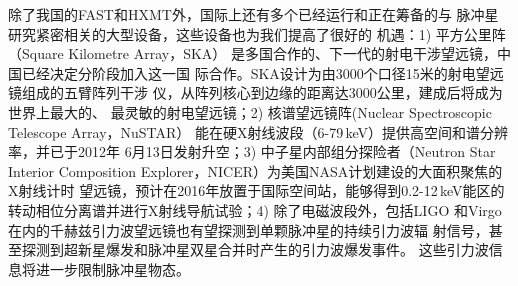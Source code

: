 除了我国的FAST和HXMT外，国际上还有多个已经运行和正在筹备的与
脉冲星研究紧密相关的大型设备，这些设备也为我们提高了很好的
机遇：1) 平方公里阵（Square Kilometre Array，SKA）
是多国合作的、下一代的射电干涉望远镜，中国已经决定分阶段加入这一国
际合作。SKA设计为由3000个口径15米的射电望远镜组成的五臂阵列干涉
仪，从阵列核心到边缘的距离达3000公里，建成后将成为世界上最大的、
最灵敏的射电望远镜；2) 核谱望远镜阵(Nuclear Spectroscopic Telescope Array，NuSTAR）
能在硬X射线波段（6-79\,keV）提供高空间和谱分辨率，并已于2012年
6月13日发射升空；3) 中子星内部组分探险者（Neutron Star Interior Composition 
Explorer，NICER）为美国NASA计划建设的大面积聚焦的X射线计时
望远镜，预计在2016年放置于国际空间站，能够得到0.2-12\,keV能区的
转动相位分离谱并进行X射线导航试验；4) 除了电磁波段外，包括LIGO
和Virgo在内的千赫兹引力波望远镜也有望探测到单颗脉冲星的持续引力波辐
射信号，甚至探测到超新星爆发和脉冲星双星合并时产生的引力波爆发事件。
这些引力波信息将进一步限制脉冲星物态。

\pkuthssffaq

